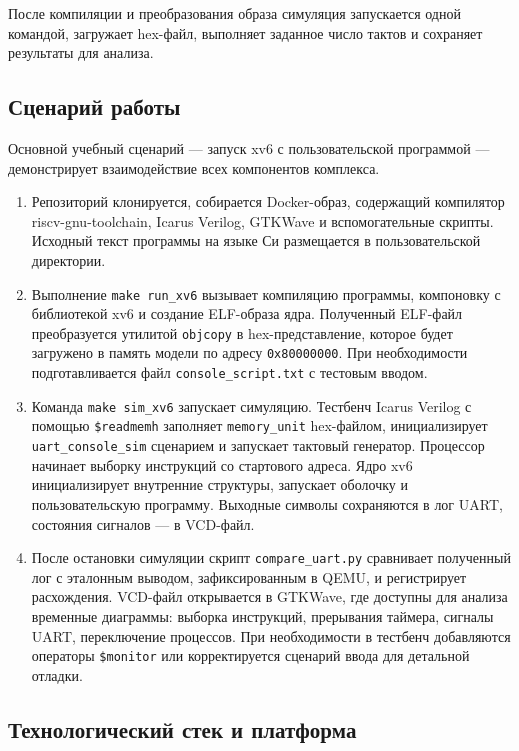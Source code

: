 После компиляции и преобразования образа симуляция запускается одной командой, загружает hex-файл, выполняет заданное число тактов и сохраняет результаты для анализа.

\subsection{Сценарий работы}

Основной учебный сценарий --- запуск xv6 с пользовательской программой --- демонстрирует взаимодействие всех компонентов комплекса.

\begin{enumerate}
  \item Репозиторий клонируется, собирается Docker-образ, содержащий компилятор riscv-gnu-toolchain, Icarus Verilog, GTKWave и вспомогательные скрипты. Исходный текст программы на языке Си размещается в пользовательской директории.
  \item Выполнение \texttt{make run\_xv6} вызывает компиляцию программы, компоновку с библиотекой xv6 и создание ELF-образа ядра. Полученный ELF-файл преобразуется утилитой \texttt{objcopy} в hex-представление, которое будет загружено в память модели по адресу \texttt{0x80000000}. При необходимости подготавливается файл \texttt{console\_script.txt} с тестовым вводом.
  \item Команда \texttt{make sim\_xv6} запускает симуляцию. Тестбенч Icarus Verilog с помощью \texttt{\$readmemh} заполняет \texttt{memory\_unit} hex-файлом, инициализирует \texttt{uart\_console\_sim} сценарием и запускает тактовый генератор. Процессор начинает выборку инструкций со стартового адреса. Ядро xv6 инициализирует внутренние структуры, запускает оболочку и пользовательскую программу. Выходные символы сохраняются в лог UART, состояния сигналов --- в VCD-файл.
  \item После остановки симуляции скрипт \texttt{compare\_uart.py} сравнивает полученный лог с эталонным выводом, зафиксированным в QEMU, и регистрирует расхождения. VCD-файл открывается в GTKWave, где доступны для анализа временные диаграммы: выборка инструкций, прерывания таймера, сигналы UART, переключение процессов. При необходимости в тестбенч добавляются операторы \texttt{\$monitor} или корректируется сценарий ввода для детальной отладки.
\end{enumerate}

\subsection{Технологический стек и платформа}


